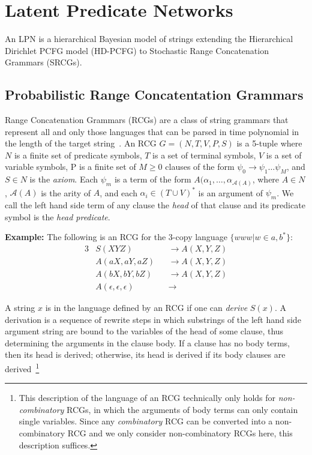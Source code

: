 \documentclass[11pt, twocolumn]{article}
\begin{document}
\section{Latent Predicate Networks}

An LPN is a hierarchical Bayesian model of strings
extending the Hierarchical Dirichlet PCFG model (HD-PCFG) to
Stochastic Range Concatenation Grammars (SRCGs). 

\subsection{Probabilistic Range Concatentation Grammars}
Range Concatenation Grammars (RCGs) are a class of string grammars
that represent all and only those languages that can be parsed in time
polynomial in the length of the target
string~\cite{boullier2005range}. An RCG $G=(N, T, V, P, S)$ is a
5-tuple where $N$ is a finite set of predicate symbols, $T$ is a set
of terminal symbols, $V$ is a set of variable symbols, P is a finite
set of $M \geq 0$ clauses of the form $\psi_0 \rightarrow \psi_1 \dots
\psi_M$, and $S \in N$ is the \emph{axiom}. Each $\psi_m$ is a term of
the form $A(\alpha_1, \dots, \alpha_{\mathcal{A}(A)}$, where $A \in
N$, $\mathcal{A}(A)$ is the arity of $A$, and each $\alpha_i \in (T
\cup V)^*$ is an argument of $\psi_m$. We call the left hand side term
of any clause the \emph{head} of that clause and its predicate symbol
is the \emph{head predicate}.

\textbf{Example:} The following is an RCG for the 3-copy language
$\{www | w \in {a, b}^*\}$:
\begin{alignat*}{3}
&S(XYZ) &&\rightarrow A(X, Y, Z)\\
&A(aX, aY, aZ) &&\rightarrow A(X, Y, Z)\\
&A(bX, bY, bZ) &&\rightarrow A(X, Y, Z)\\
&A(\epsilon, \epsilon, \epsilon) &&\rightarrow 
\end{alignat*}

A string $x$ is in the language defined by an RCG if one can
\emph{derive} $S(x)$. A derivation is a sequence of rewrite steps in
which substrings of the left hand side argument string are bound to
the variables of the head of some clause, thus determining the
arguments in the clause body. If a clause has no body terms, then its
head is derived; otherwise, its head is derived if its body clauses
are derived~\footnote{This description of the language of an RCG
  technically only holds for \emph{non-combinatory} RCGs, in which the
  arguments of body terms can only contain single variables. Since any
  \emph{combinatory} RCG can be converted into a non-combinatory RCG
  and we only consider non-combinatory RCGs here, this description
  suffices.}
\end{document}
